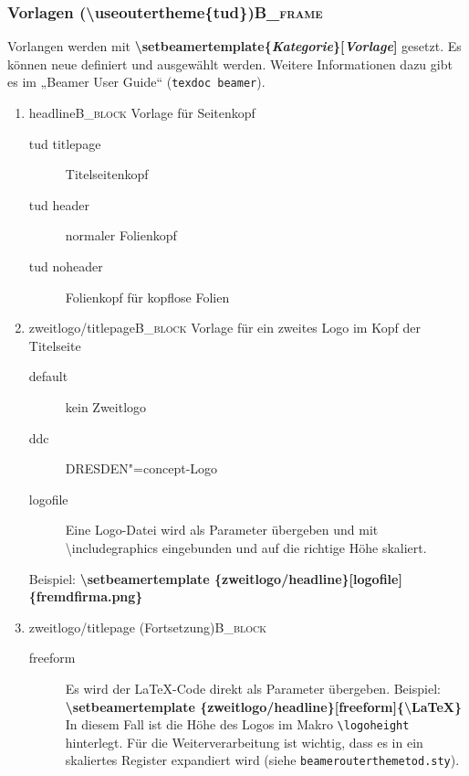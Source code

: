 \documentclass[presentation,t]{beamer}
\begin{document}
\subsubsection[Vorlagen (\textbackslash useoutertheme\{tud\})]{Vorlagen (\textbackslash useoutertheme\{tud\})\hfill{}\textsc{B\_frame}}
\label{sec:orgfc73643}
Vorlangen werden mit 
\textbf{\textbackslash setbeamertemplate\{\emph{Kategorie}\}[\emph{Vorlage}]}
gesetzt. Es können neue
definiert und ausgewählt werden. Weitere Informationen dazu gibt es im
„Beamer User Guide“ (\texttt{texdoc beamer}).
\begin{enumerate}
\item headline\hfill{}\textsc{B\_block}
\label{sec:org649c8fb}
Vorlage für Seitenkopf
\begin{description}
\item[{tud titlepage}] Titelseitenkopf
\item[{tud header}] normaler Folienkopf
\item[{tud noheader}] Folienkopf für kopflose Folien
\end{description}

\item zweitlogo/titlepage\hfill{}\textsc{B\_block}
\label{sec:orgf7184d8}
Vorlage für ein zweites Logo im Kopf der Titelseite
\begin{description}
\item[{default}] kein Zweitlogo
\item[{ddc}] DRESDEN"=concept-Logo
\item[{logofile}] Eine Logo-Datei wird als Parameter übergeben und mit
\textbackslash includegraphics eingebunden und auf die
richtige Höhe skaliert.
\end{description}
Beispiel: 
\textbf{\textbackslash \mbox{setbeamertemplate} \{zweitlogo/headline\}[logofile]\{fremdfirma.png\}}
\item zweitlogo/titlepage (Fortsetzung)\hfill{}\textsc{B\_block}
\label{sec:orgd7d9779}
\begin{description}
\item[{freeform}] Es wird der \LaTeX -Code direkt als Parameter übergeben. Beispiel:
\textbf{\textbackslash \mbox{setbeamertemplate} \{zweitlogo/headline\}[freeform]\{\textbackslash LaTeX\}}
In diesem Fall ist die Höhe des Logos im Makro
\texttt{\textbackslash logoheight} hinterlegt. Für die
Weiterverarbeitung ist wichtig, dass es in ein
skaliertes Register expandiert wird (siehe
\texttt{beamerouterthemetod.sty}).
\end{description}


\end{enumerate}
\end{document}
